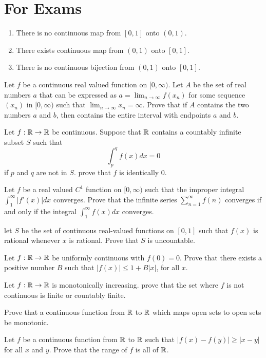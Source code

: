 \section{For Exams}

\question[Fa82] \begin{enumerate}
    \item There is no continuous map from $[0,1]$ onto $(0,1)$.
    \item There exists continuous map from $(0,1)$ onto $[0,1]$.
    \item There is no continuous bijection from $(0,1)$ onto $[0,1]$.
\end{enumerate}

\question[Fa93] Let $f$ be a continuous real valued function on $[0,\infty)$. Let $A$ be the set of real numbers $a$ that can be expressed as $a=\lim_{n\to\infty}{f(x_n)}$ for some sequence $(x_n)$ in $[0,\infty)$ such that $\lim_{n\to\infty}{x_n}=\infty$. Prove that if $A$ contains the two numbers $a$ and $b$, then contains the entire interval with endpoints $a$ and $b$.

\question[Su78] Let $f:\mathbb{R}\to\mathbb{R}$ be continuous. Suppose that $\mathbb{R}$ contains a countably infinite subset $S$ such that
$$\int_{p}^{q}{f(x)dx}=0$$
if $p$ and $q$ are not in $S$. prove that $f$ is identically 0.

\question[Sp93] Let $f$ be a real valued $C^1$ function on $[0,\infty)$ such that the improper integral $\int_{1}^{\infty}{|f'(x)|dx}$ converges. Prove that the infinite series $\sum_{n=1}^{\infty}{f(n)}$ converges if and only if the integral $\int_{1}^{\infty}{f(x)dx}$ converges.

\question[Fa01] let $S$ be the set of continuous real-valued functions on $[0,1]$ such that $f(x)$ is rational whenever $x$ is rational. Prove that $S$ is uncountable.

\question[fa00] Let $f:\mathbb{R}\to\mathbb{R}$ be uniformly continuous with $f(0)=0$. Prove that there exists a positive number $B$ such that $|f(x)|\leq 1+B|x|$, for all $x$.

\question[Fa78] Let $f:\mathbb{R}\to\mathbb{R}$ is monotonically increasing. prove that the set where $f$ is not continuous is finite or countably finite.

\question[Su83] Prove that a continuous function from $\mathbb{R}$ to $\mathbb{R}$ which maps open sets to open sets be monotonic.

\question[fa91] Let $f$ be a continuous function from $\mathbb{R}$ to $\mathbb{R}$ such that $|f(x)-f(y)|\geq|x-y|$ for all $x$ and $y$. Prove that the range of $f$ is all of $\mathbb{R}$.

